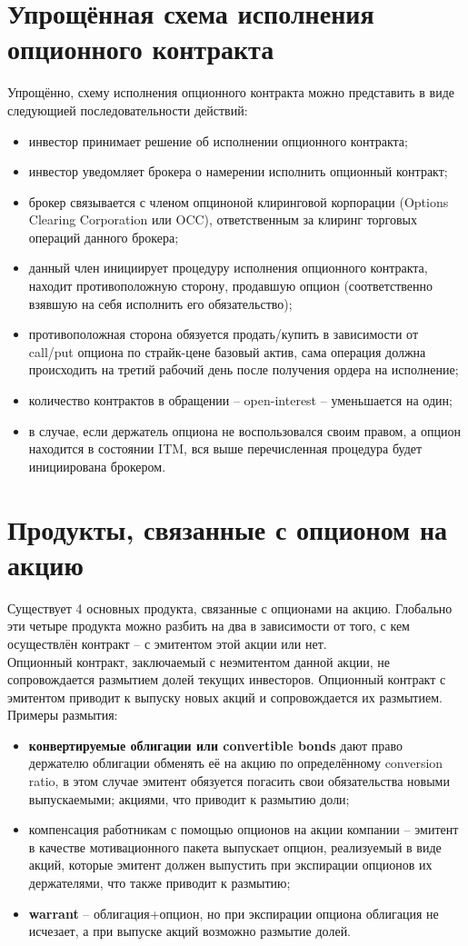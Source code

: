 \documentclass{article}
\begin{document}
 \section{Упрощённая схема исполнения опционного контракта}
 Упрощённо, схему исполнения опционного контракта можно представить в виде следующией последовательности действий:
 \begin{itemize}
    \item инвестор принимает решение об исполнении опционного контракта;
    \item инвестор уведомляет брокера о намерении исполнить опционный контракт;
    \item брокер связывается с членом опциноной клиринговой корпорации (Options Clearing Corporation или OCC), ответственным за клиринг торговых операций данного брокера;
    \item данный член инициирует процедуру исполнения опционного контракта, находит противоположную сторону, продавшую опцион (соответственно взявшую на себя исполнить его обязательство);
    \item противоположная сторона обязуется продать/купить в зависимости от call/put опциона по страйк-цене базовый актив, сама операция должна происходить на третий рабочий день после получения ордера на исполнение;
    \item количество контрактов в обращении -- open-interest -- уменьшается на один;
    \item в случае, если держатель опциона не воспользовался своим правом, а опцион находится в состоянии ITM, вся выше перечисленная процедура будет инициирована брокером.
 \end{itemize}
 \section{Продукты, связанные с опционом на акцию}
Существует 4 основных продукта, связанные с опционами на акцию. Глобально эти четыре продукта можно разбить на два в зависимости от того, с кем осуществлён контракт -- с эмитентом этой акции или нет.\\
Опционный контракт, заключаемый с неэмитентом данной акции, не сопровождается размытием долей текущих инвесторов. Опционный контракт с эмитентом приводит к выпуску новых акций и сопровождается их размытием. Примеры размытия:\\
\begin{itemize}
    \item \textbf{конвертируемые облигации или convertible bonds} дают право держателю облигации обменять её на акцию по определённому conversion ratio, в этом случае эмитент обязуется погасить свои обязательства новыми выпускаемыми; акциями, что приводит к размытию доли;
    \item компенсация работникам с помощью опционов на акции компании -- эмитент в качестве мотивационного пакета выпускает опцион, реализуемый в виде акций, которые эмитент должен выпустить при экспирации опционов их держателями, что также приводит к размытию;
    \item \textbf{warrant} -- облигация+опцион, но при экспирации опциона облигация не исчезает, а при выпуске акций возможно размытие долей.
\end{itemize}
\end{document}
